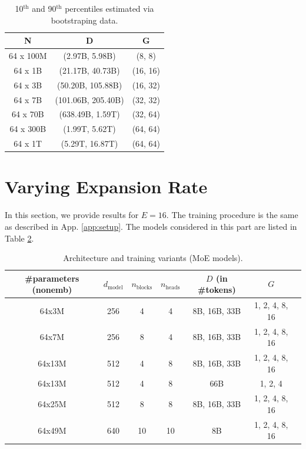 \documentclass{article} %
\theoremstyle{plain}
\theoremstyle{definition}
\theoremstyle{remark}
\newcommand{\dmodel}{d_\text{model}}
\newcommand{\nblocks}{n_\text{blocks}}
\newcommand{\nheads}{n_\text{heads}}
\begin{document}
\begin{table}[h]
    \centering
    \caption{10$^\text{th}$ and 90$^\text{th}$ percentiles estimated via bootstraping data.}
    \vspace{0.4cm}
    \begin{tabular}{ccc}
        \toprule
        N & D & G \\
        \midrule
        64 x 100M & (2.97B, 5.98B) & (8, 8) \\ 
        64 x 1B & (21.17B, 40.73B)  & (16, 16)  \\
        64 x 3B & (50.20B, 105.88B)  &  (16, 32)  \\
        64 x 7B & (101.06B, 205.40B)   &  (32, 32)  \\
        64 x 70B & (638.49B, 1.59T) & (32, 64) \\
        64 x 300B & (1.99T, 5.62T)  &  (64, 64) \\
        64 x 1T & (5.29T, 16.87T)   & (64, 64) \\
        \bottomrule
    \end{tabular}
    \label{tab:bootstrap}
\end{table}
\section{Varying Expansion Rate} \label{app:exp_rate}
In this section, we provide results for $E=16.$ The training procedure is the same as described in App. \ref{app:setup}. The models considered in this part are listed in Table \ref{tab:moe_16}. 

\begin{table}[h] 
    \centering
    \caption{Architecture and training variants (MoE models).}
    \vspace{0.4cm}
    \begin{tabular}{ccccccc}
        \toprule
        \#parameters (nonemb) & $\dmodel$ & $\nblocks$ & $\nheads$ & $D$ (in \#tokens) & $G$\\
        \midrule
        64x3M  & 256 & 4 & 4 & 8B, 16B, 33B & 1, 2, 4, 8, 16  \\
        64x7M & 256 & 8 & 4 & 8B, 16B, 33B & 1, 2, 4, 8, 16 \\
        64x13M & 512 & 4 & 8 & 8B, 16B, 33B & 1, 2, 4, 8, 16 \\
        64x13M & 512 & 4 & 8 & 66B & 1, 2, 4 \\
        64x25M & 512 & 8 & 8 & 8B, 16B, 33B & 1, 2, 4, 8, 16 \\
        64x49M & 640 & 10 & 10 & 8B & 1, 2, 4, 8, 16 \\
        \bottomrule
    \end{tabular}
    \label{tab:moe_16}
\end{table}
\end{document}
